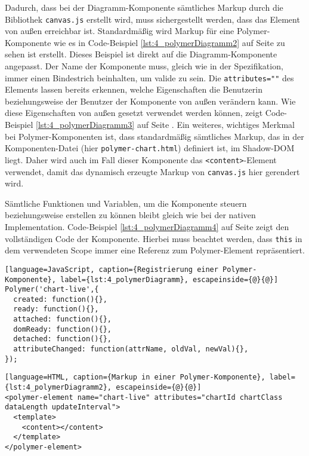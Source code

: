 Dadurch, dass bei der Diagramm-Komponente sämtliches Markup durch die Bibliothek \lstinline|canvas.js| erstellt wird, muss sichergestellt werden, dass das Element von außen erreichbar ist. Standardmäßig wird Markup für eine Polymer-Komponente wie es in Code-Beispiel \ref{lst:4_polymerDiagramm2} auf Seite \pageref{lst:4_polymerDiagramm2} zu sehen ist erstellt. Dieses Beispiel ist direkt auf die Diagramm-Komponente angepasst. Der Name der Komponente muss, gleich wie in der Spezifikation, immer einen Bindestrich beinhalten, um valide zu sein. Die \lstinline|attributes=""| des Elements lassen bereits erkennen, welche Eigenschaften die Benutzerin beziehungsweise der Benutzer der Komponente von außen verändern kann. Wie diese Eigenschaften von außen gesetzt verwendet werden können, zeigt Code-Beispiel \ref{lst:4_polymerDiagramm3} auf Seite \pageref{lst:4_polymerDiagramm3}. Ein weiteres, wichtiges Merkmal bei Polymer-Komponenten ist, dass standardmäßig sämtliches Markup, das in der Komponenten-Datei (hier \lstinline|polymer-chart.html|) definiert ist, im Shadow-DOM liegt. Daher wird auch im Fall dieser Komponente das \lstinline|<content>|-Element verwendet, damit das dynamisch erzeugte Markup von \lstinline|canvas.js| hier gerendert wird.

Sämtliche Funktionen und Variablen, um die Komponente steuern beziehungsweise erstellen zu können bleibt gleich wie bei der nativen Implementation. Code-Beispiel \ref{lst:4_polymerDiagramm4} auf Seite \pageref{lst:4_polymerDiagramm4} zeigt den vollständigen Code der Komponente. Hierbei muss beachtet werden, dass \lstinline|this| in dem verwendeten Scope immer eine Referenz zum Polymer-Element repräsentiert.

\begin{lstlisting}[language=JavaScript, caption={Registrierung einer Polymer-Komponente}, label={lst:4_polymerDiagramm}, escapeinside={@}{@}]
Polymer('chart-live',{
  created: function(){},
  ready: function(){},
  attached: function(){},
  domReady: function(){},
  detached: function(){},
  attributeChanged: function(attrName, oldVal, newVal){},
});
\end{lstlisting}

\begin{lstlisting}[language=HTML, caption={Markup in einer Polymer-Komponente}, label={lst:4_polymerDiagramm2}, escapeinside={@}{@}]
<polymer-element name="chart-live" attributes="chartId chartClass dataLength updateInterval">
  <template>
    <content></content>
  </template>
</polymer-element>
\end{lstlisting}

